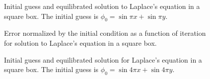 \documentclass[11pt]{article}
\begin{document}
\begin{enumerate}[label=(\alph*)]
\begin{figure}[p]
\centerline{}
\caption{Initial guess and equilibrated solution to Laplace's equation in a square box. The initial guess is $\phi_0 = \sin \pi x + \sin \pi y$.}
    \label{sin_half}
\end{figure}

\begin{figure}[p]
\centerline{}
\caption{Error normalized by the initial condition as a function of iteration for solution to Laplace's equation in a square box.}
    \label{error}
\end{figure}



\begin{figure}[p]
\centerline{}
\caption{Initial guess and equilibrated solution for Laplace's equation in a square box. The initial guess is $\phi_0 = \sin 4\pi x + \sin 4\pi y$.}
    \label{sin_four}
\end{figure}



\end{enumerate}




\end{document}
